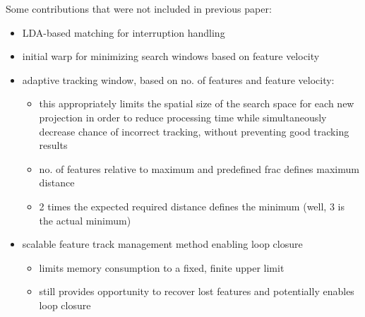 Some contributions that were not included in previous paper:

\begin{itemize}
	\item LDA-based matching for interruption handling
	\item initial warp for minimizing search windows based on feature velocity
	\item adaptive tracking window, based on no. of features and feature velocity:
	\begin{itemize}
	  \item this appropriately limits the spatial size of the search space for each new projection in order to reduce processing time while simultaneously decrease chance of incorrect tracking, without preventing good tracking results
		\item no. of features relative to maximum and predefined frac defines maximum distance
		\item 2 times the expected required distance defines the minimum (well, 3 is the actual minimum)
	\end{itemize}
	\item scalable feature track management method enabling loop closure
	\begin{itemize}
	  \item limits memory consumption to a fixed, finite upper limit
		\item still provides opportunity to recover lost features and potentially enables loop closure
	\end{itemize}
\end{itemize}




